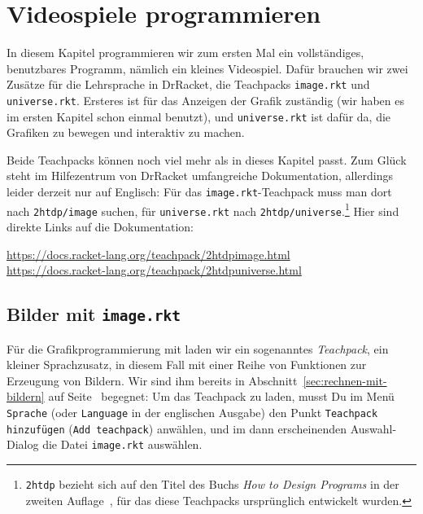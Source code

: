 
\chapter{Videospiele programmieren}
\label{cha:representation-and-state}

In diesem Kapitel programmieren wir zum ersten Mal ein vollständiges,
benutzbares Programm, nämlich ein kleines Videospiel.  Dafür brauchen
wir zwei Zusätze für die Lehrsprache in DrRacket, die Teachpacks
\texttt{image.rkt} und \texttt{universe.rkt}.  Ersteres ist für das
Anzeigen der Grafik zuständig (wir haben es im ersten Kapitel schon
einmal benutzt), und \texttt{universe.rkt} ist dafür da, die Grafiken
zu bewegen und interaktiv zu machen.

Beide Teachpacks können noch viel mehr als in dieses Kapitel passt.
Zum Glück steht im Hilfezentrum von DrRacket umfangreiche
Dokumentation, allerdings leider derzeit nur auf Englisch: Für das
\texttt{image.rkt}-Teachpack muss man dort nach \texttt{2htdp/image}
suchen, für \texttt{universe.rkt} nach
\texttt{2htdp/universe}.\footnote{\texttt{2htdp} bezieht sich auf den
  Titel des Buchs \textit{How to Design Programs} in der zweiten
  Auflage~\cite{FelleisenFindlerFlattKrishnamurthi2001}, für das diese
Teachpacks ursprünglich entwickelt wurden.}  Hier sind direkte Links
auf die Dokumentation:
%
\begin{flushleft}
\url{https://docs.racket-lang.org/teachpack/2htdpimage.html}\\
\url{https://docs.racket-lang.org/teachpack/2htdpuniverse.html}
\end{flushleft}

\section{Bilder mit \texttt{image.rkt}}

Für die Grafikprogrammierung mit \drscheme{} laden wir ein sogenanntes
\textit{Teachpack}, ein kleiner Sprachzusatz, in
diesem Fall mit einer Reihe von Funktionen zur Erzeugung von Bildern.
Wir sind ihm bereits in Abschnitt~\ref{sec:rechnen-mit-bildern} auf
Seite~\pageref{sec:rechnen-mit-bildern} begegnet: Um das Teachpack zu
laden, musst Du im Menü \texttt{Sprache} (oder \texttt{Language} in
der englischen Ausgabe) den Punkt \texttt{Teachpack hinzufügen}
(\texttt{Add teachpack}) anwählen, und im dann erscheinenden
Auswahl-Dialog die Datei
\texttt{image.rkt} auswählen.


